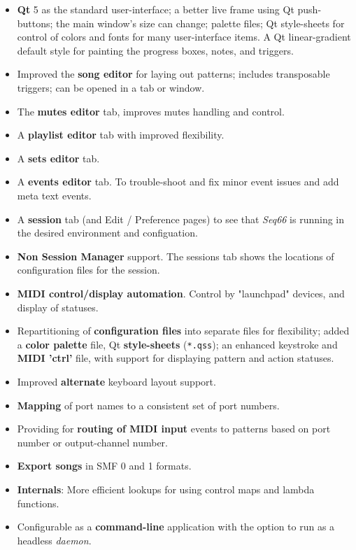 \documentclass[
 11pt,
 twoside,
 a4paper,
 final                                 %
]{article}
\begin{document}
   \begin{itemize}
      \item \textbf{Qt} 5 as the standard user-interface;
         a better live frame using Qt push-buttons;
         the main window's size can change;
         palette files;
         Qt style-sheets for control of colors and fonts for many
         user-interface items.
         A Qt linear-gradient default style for painting the
         progress boxes, notes, and triggers.
      \item Improved the \textbf{song editor} for laying out patterns;
         includes transposable triggers;
         can be opened in a tab or window.
      \item The \textbf{mutes editor} tab, improves mutes handling and control.
      \item A \textbf{playlist editor} tab with improved flexibility.
      \item A \textbf{sets editor} tab.
      \item A \textbf{events editor} tab.
         To trouble-shoot and fix minor event issues and add meta text events.
      \item A \textbf{session} tab (and Edit / Preference pages) to see that
         \textsl{Seq66} is running in the desired environment and configuation.
      \item \textbf{Non Session Manager} support. The sessions tab shows the
         locations of configuration files for the session.
      \item \textbf{MIDI control/display automation}.
         Control by "launchpad" devices, and display of statuses.
      \item Repartitioning of \textbf{configuration files} into separate files
         for flexibility; added a \textbf{color palette} file,
         Qt \textbf{style-sheets} (\texttt{*.qss});
         an enhanced keystroke and \textbf{MIDI 'ctrl'} file, with
         support for displaying pattern and action statuses.
      \item Improved \textbf{alternate} keyboard layout support.
      \item \textbf{Mapping} of port names to a consistent set of port numbers.
      \item Providing for \textbf{routing of MIDI input} events to
         patterns based on port number or output-channel number.
      \item \textbf{Export songs} in SMF 0 and 1 formats.
      \item \textbf{Internals}:
         More efficient lookups for using control maps and lambda functions.
      \item Configurable as a \textbf{command-line} application
         with the option to run as a headless \textsl{daemon}.
   \end{itemize}
\end{document}
